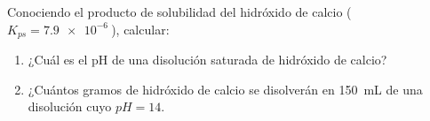 Conociendo el producto de solubilidad del hidróxido de calcio ($K_{ps}= \SI{7,9e-6}{}$), calcular:
\begin{enumerate}[label={\alph*)},font={\color{red!50!black}\bfseries}]
    \item ¿Cuál es el pH de una disolución saturada de hidróxido de calcio?
    \item ¿Cuántos gramos de hidróxido de calcio se disolverán en \SI{150}{\milli\liter} de una disolución cuyo $pH = 14$.
\end{enumerate}        
